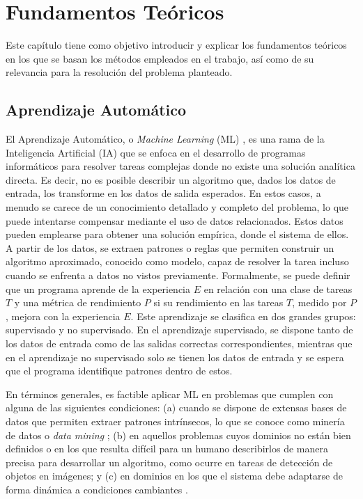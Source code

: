 \chapter{Fundamentos Teóricos}
Este capítulo tiene como objetivo introducir y explicar los fundamentos teóricos en los que se basan los métodos empleados en el trabajo, así como de su relevancia para la resolución del problema planteado.

\section{Aprendizaje Automático}
El Aprendizaje Automático, o \textit{Machine Learning} (ML) \cite{abu-mostafa_learning_2012, mitchell_introduction_1997, 6284961}, es una rama de la Inteligencia Artificial (IA) que se enfoca en el desarrollo de programas informáticos para resolver tareas complejas donde no existe una solución analítica directa. Es decir, no es posible describir un algoritmo que, dados los datos de entrada, los transforme en los datos de salida esperados. En estos casos, a menudo se carece de un conocimiento detallado y completo del problema, lo que puede intentarse compensar mediante el uso de datos relacionados. Estos datos pueden emplearse para obtener una solución empírica, donde el sistema  de ellos. A partir de los datos, se extraen patrones o reglas que permiten construir un algoritmo aproximado, conocido como modelo, capaz de resolver la tarea incluso cuando se enfrenta a datos no vistos previamente. Formalmente, se puede definir que un programa aprende de la experiencia $E$ en relación con una clase de tareas $T$ y una métrica de rendimiento $P$ si su rendimiento en las tareas $T$, medido por $P$, mejora con la experiencia $E$. Este aprendizaje se clasifica en dos grandes grupos: supervisado y no supervisado. En el aprendizaje supervisado, se dispone tanto de los datos de entrada como de las salidas correctas correspondientes, mientras que en el aprendizaje no supervisado solo se tienen los datos de entrada y se espera que el programa identifique patrones dentro de estos.

En términos generales, es factible aplicar ML en problemas que cumplen con alguna de las siguientes condiciones: (a) cuando se dispone de extensas bases de datos que permiten extraer patrones intrínsecos, lo que se conoce como minería de datos o \textit{data mining} \cite{alma991006986149704990}; (b) en aquellos problemas cuyos dominios no están bien definidos o en los que resulta difícil para un humano describirlos de manera precisa para desarrollar un algoritmo, como ocurre en tareas de detección de objetos en imágenes; y (c) en dominios en los que el sistema debe adaptarse de forma dinámica a condiciones cambiantes \cite{mitchell_introduction_1997}.

